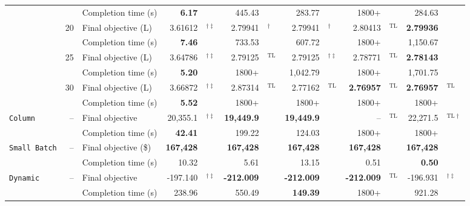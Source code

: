 \begin{table}[htbp]
\begin{threeparttable}
\begin{tabular}{@{}lrlr@{}lr@{}lr@{}lr@{}lr@{}l@{}}
 & & Completion time (s) & \textbf{6.17} & & 445.43 & & 283.77 & & 1800+ & & 284.63 & \\
\addlinespace[2pt]
 & \multirow{2}{*}{20} & Final objective (L) & 3.61612 & \({}^{\dagger\ddagger}\) & 2.79941 & \({}^{\dagger}\) & 2.79941 & \({}^{\dagger}\) & 2.80413 & \({}^{\mathrm{TL}}\) & \textbf{2.79936} & \\
 & & Completion time (s) & \textbf{7.46} & & 733.53 & & 607.72 & & 1800+ & & 1{,}150.67 & \\
\addlinespace[2pt]
 & \multirow{2}{*}{25} & Final objective (L) & 3.64786 & \({}^{\dagger\ddagger}\) & 2.79125 & \({}^{\mathrm{TL}}\) & 2.79125 & \({}^{\dagger\ddagger}\) & 2.78771 & \({}^{\mathrm{TL}}\) & \textbf{2.78143} & \\
 & & Completion time (s) & \textbf{5.20} & & 1800+ & & 1{,}042.79 & & 1800+ & & 1{,}701.75 & \\
\addlinespace[2pt]
 & \multirow{2}{*}{30} & Final objective (L) & 3.66872 & \({}^{\dagger\ddagger}\) & 2.87314 & \({}^{\mathrm{TL}}\) & 2.77162 & \({}^{\mathrm{TL}}\) & \textbf{2.76957} & \({}^{\mathrm{TL}}\) & \textbf{2.76957} & \({}^{\mathrm{TL}}\) \\
 & & Completion time (s) & \textbf{5.52} & & 1800+ & & 1800+ & & 1800+ & & 1800+ & \\
\midrule
\multirow{2}{*}{\texttt{Column}} & \multirow{2}{*}{--} & Final objective & 20{,}355.1 & \({}^{\dagger\ddagger}\) & \textbf{19{,}449.9} & & \textbf{19{,}449.9} & & -- & \({}^{\mathrm{TL}}\) & 22{,}271.5 & \({}^{\mathrm{TL}\dagger}\) \\
 & & Completion time (s) & \textbf{42.41} & & 199.22 & & 124.03 & & 1800+ & & 1800+ & \\
\midrule
\multirow{2}{*}{\texttt{Small Batch}} & \multirow{2}{*}{--} & Final objective (\$) & \textbf{167{,}428} & & \textbf{167{,}428} & & \textbf{167{,}428} & & \textbf{167{,}428} & & \textbf{167{,}428} & \\
 & & Completion time (s) & 10.32 & & 5.61 & & 13.15 & & 0.51 & & \textbf{0.50} & \\
\midrule
\multirow{2}{*}{\texttt{Dynamic}} & \multirow{2}{*}{--} & Final objective & -197.140 & \({}^{\dagger\ddagger}\) & \textbf{-212.009} & & \textbf{-212.009} & & \textbf{-212.009} & \({}^{\mathrm{TL}}\) & -196.931 & \({}^{\dagger\ddagger}\) \\
 & & Completion time (s) & 238.96 & & 550.49 & & \textbf{149.39} & & 1800+ & & 921.28 & \\
\bottomrule
\end{tabular}

\end{threeparttable}
\end{table}
